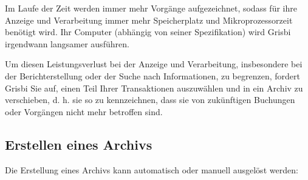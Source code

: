 \vspace{.2em}
Im Laufe der Zeit werden immer mehr Vorgänge aufgezeichnet, sodass für ihre Anzeige und Verarbeitung immer mehr Speicherplatz und Mikroprozessorzeit benötigt wird. Ihr Computer (abhängig von seiner Spezifikation) wird Grisbi irgendwann langsamer ausführen.

\vspace{.2em}
Um diesen Leistungsverlust bei der Anzeige und Verarbeitung, insbesondere bei der Berichterstellung oder der Suche nach Informationen, zu begrenzen, fordert Grisbi Sie auf, einen Teil Ihrer Transaktionen auszuwählen und in ein Archiv zu verschieben, d. h. sie so zu kennzeichnen, dass sie von zukünftigen Buchungen oder Vorgängen nicht mehr betroffen sind.

\subsection{Erstellen eines Archivs\label{datamanagement-archive-new}}%

Die Erstellung eines Archivs kann automatisch oder manuell ausgelöst werden:

